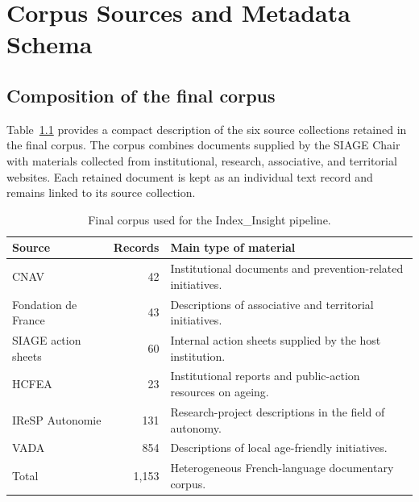 
\appendix

\chapter{Corpus Sources and Metadata Schema}

\section{Composition of the final corpus}

Table~\ref{tab:appendix-corpus-sources} provides a compact description of the
six source collections retained in the final corpus. The corpus combines
documents supplied by the SIAGE Chair with materials collected from institutional,
research, associative, and territorial websites. Each retained document is kept
as an individual text record and remains linked to its source collection.

\begin{table}[H]
\centering
\begin{tabular}{lrp{8cm}}
\toprule
Source & Records & Main type of material \\
\midrule
CNAV & 42 & Institutional documents and prevention-related initiatives. \\
Fondation de France & 43 & Descriptions of associative and territorial initiatives. \\
SIAGE action sheets & 60 & Internal action sheets supplied by the host institution. \\
HCFEA & 23 & Institutional reports and public-action resources on ageing. \\
IReSP Autonomie & 131 & Research-project descriptions in the field of autonomy. \\
VADA & 854 & Descriptions of local age-friendly initiatives. \\
\midrule
Total & 1,153 & Heterogeneous French-language documentary corpus. \\
\bottomrule
\end{tabular}
\caption{Final corpus used for the Index\_Insight pipeline.}
\label{tab:appendix-corpus-sources}
\end{table}

